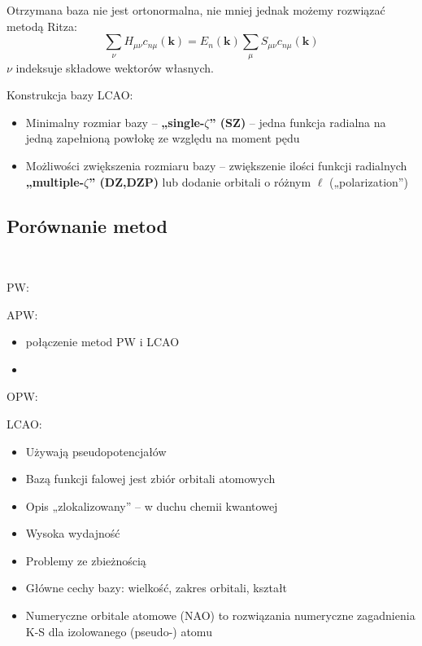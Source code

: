Otrzymana baza nie jest ortonormalna, nie mniej jednak możemy rozwiązać metodą Ritza:
\begin{equation}
\sum_{\nu} H_{\mu\nu} c_{n\mu}\left(\boldsymbol{k}\right) = E_{n}\left(\boldsymbol{k}\right) \sum_{\mu} S_{\mu\nu} c_{n\mu}\left(\boldsymbol{k}\right)
\end{equation}
$\nu$ indeksuje składowe wektorów własnych.

Konstrukcja bazy LCAO:
\begin{itemize}
	\item Minimalny rozmiar bazy – \textbf{„single-$\zeta$” (SZ)} – jedna funkcja radialna na jedną zapełnioną powłokę ze względu na moment pędu
	\item Możliwości zwiększenia rozmiaru bazy – zwiększenie ilości funkcji radialnych \textbf{„multiple-$\zeta$” (DZ,DZP)} lub dodanie orbitali o różnym $\ell$ („polarization”)
\end{itemize}


\newpage
\subsection{Porównanie metod}
~\\
\begin{multicols}{2}
PW:

APW:
\begin{itemize}
	\item połączenie metod PW i LCAO
	\item 
\end{itemize}

OPW:

LCAO:
\begin{itemize}
	\item Używają pseudopotencjałów
	\item Bazą funkcji falowej jest zbiór orbitali atomowych
	\item Opis „zlokalizowany” – w duchu chemii kwantowej
	\item Wysoka wydajność
	\item Problemy ze zbieżnością
	\item Główne cechy bazy: wielkość, zakres orbitali, kształt
	\item Numeryczne orbitale atomowe (NAO) to rozwiązania numeryczne zagadnienia K-S dla izolowanego (pseudo-) atomu
\end{itemize}

\end{multicols}

